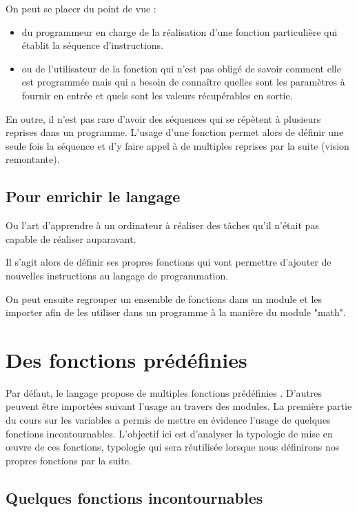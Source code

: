 On peut se placer du point de vue :
\begin{itemize}
\item du programmeur en charge de la réalisation d'une fonction particulière qui établit la séquence d'instructions.
\item ou de l'utilisateur de la fonction qui n'est pas obligé de savoir comment elle est programmée mais qui a besoin de connaître quelles sont les paramètres à fournir en entrée et quels sont les valeurs récupérables en sortie.
\end{itemize}

En outre, il n'est pas rare d'avoir des séquences qui se répètent à plusieurs reprises dans un programme. L'usage d'une fonction permet alors de définir une seule fois la séquence et d'y faire appel à de multiples reprises par la suite (vision remontante).


\subsection{Pour enrichir le langage}

Ou l'art d'apprendre à un ordinateur à réaliser des tâches qu'il n'était pas capable de réaliser auparavant.

Il s'agit alors de définir ses propres fonctions qui vont permettre d'ajouter de nouvelles instructions au langage de programmation.

On peut ensuite regrouper un ensemble de fonctions dans un module et les importer afin de les utiliser dans un programme à la manière du module "math".

\section{Des fonctions prédéfinies}

Par défaut, le langage propose de multiples fonctions prédéfinies . D'autres peuvent être importées suivant l'usage au travers des modules. La première partie du cours sur les variables a permis de mettre en évidence l'usage de quelques fonctions incontournables. L'objectif ici est d'analyser la typologie de mise en œuvre de ces fonctions, typologie qui sera réutilisée lorsque nous définirons nos propres fonctions par la suite.

\subsection{Quelques fonctions incontournables}

